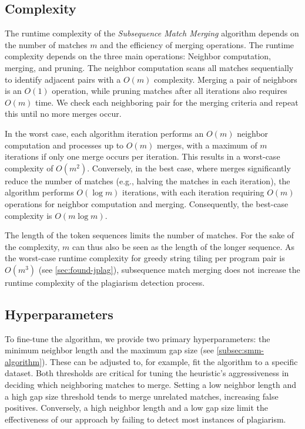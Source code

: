 \subsection{Complexity}
The runtime complexity of the \textit{Subsequence Match Merging} algorithm depends on the number of matches $m$ and the efficiency of merging operations.
The runtime complexity depends on the three main operations: Neighbor computation, merging, and pruning.
The neighbor computation scans all matches sequentially to identify adjacent pairs with a $O(m)$ complexity.
Merging a pair of neighbors is an $O(1)$ operation, while pruning matches after all iterations also requires $O(m)$ time.
We check each neighboring pair for the merging criteria and repeat this until no more merges occur.

In the worst case, each algorithm iteration performs an $O(m)$ neighbor computation and processes up to $O(m)$ merges, with a maximum of $m$ iterations if only one merge occurs per iteration. This results in a worst-case complexity of $O(m^2)$. Conversely, in the best case, where merges significantly reduce the number of matches (e.g., halving the matches in each iteration), the algorithm performs $O(\log m)$ iterations, with each iteration requiring $O(m)$ operations for neighbor computation and merging. Consequently, the best-case complexity is $O(m \log m)$.

The length of the token sequences limits the number of matches. For the sake of the complexity, $m$ can thus also be seen as the length of the longer sequence. As the worst-case runtime complexity for greedy string tiling per program pair is \( O(m^3) \) (see \autoref{sec:found-jplag}), subsequence match merging does not increase the runtime complexity of the plagiarism detection process.

\subsection{Hyperparameters}
To fine-tune the algorithm, we provide two primary hyperparameters: the minimum neighbor length and the maximum gap size (see \autoref{subsec:smm-algorithm}). These can be adjusted to, for example, fit the algorithm to a specific dataset.
Both thresholds are critical for tuning the heuristic's aggressiveness in deciding which neighboring matches to merge. Setting a low neighbor length and a high gap size threshold tends to merge unrelated matches, increasing false positives. Conversely, a high neighbor length and a low gap size limit the effectiveness of our approach by failing to detect most instances of plagiarism. 

